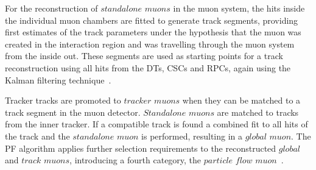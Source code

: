 For the reconstruction of $\textit{standalone muons}$ in the muon system, the hits inside the individual muon chambers are fitted to generate track segments, providing first estimates of the track parameters under the hypothesis that the muon was created in the interaction region and was travelling through the muon system from the inside out. These segments are used as starting points for a track reconstruction using all hits from the DTs, CSCs and RPCs, again using the Kalman filtering technique~\cite{1748-0221-5-03-T03022}.

Tracker tracks are promoted to $\textit{tracker muons}$ when they can be matched to a track segment in the muon detector. $\textit{Standalone muons}$ are matched to tracks from the inner tracker. If a compatible track is found a combined fit to all hits of the track and the $\textit{standalone muon}$ is performed, resulting in a $\textit{global muon}$. The PF algorithm applies further selection requirements to the reconstructed $\textit{global}$ and $\textit{track muons}$, introducing a fourth category, the $\textit{particle flow muon}$~\cite{CMS-PAS-PFT-10-003}. 

